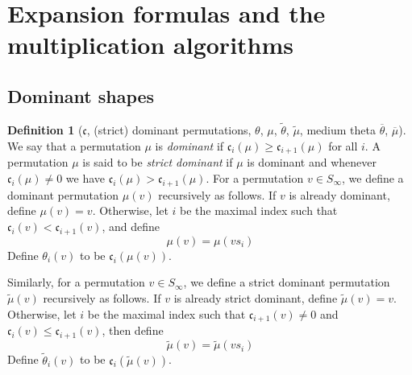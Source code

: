 \documentclass{amsart}
\theoremstyle{definition}
\newtheorem{definition}[lemma]{Definition}
\theoremstyle{remark}
\numberwithin{equation}{section}
\newcommand{\code}{\mathfrak{c}}
\begin{document}
\newcommand{\lom}{\widetilde{\lambda}}
\newcommand{\mom}{\widetilde{\mu}}
\newcommand{\thop}{\widetilde{\theta}}
\newcommand{\medperm}{\overline{\mu}}
\newcommand{\medtheta}{\overline{\theta}}
\newcommand{\Tom}[1]{\xRightarrow{#1}}
\newcommand{\dom}{\mu}

\section{Expansion formulas and the multiplication algorithms} \label{section:algorithms}

\subsection{Dominant shapes}

\begin{definition}[$\code$, (strict) dominant permutations, $\theta$, $\dom$, $\thop$, $\mom$, medium theta $\medtheta$, $\medperm$] \label{def:codetheta}
We say that a permutation $\mu$ is \emph{dominant} if $\code_i(\mu)\geq \code_{i+1}(\mu)$ for all $i$. A permutation $\mu$ is said to be \emph{strict dominant} if $\mu$ is dominant and whenever $\code_i(\mu)\neq 0$ we have $\code_i(\mu)>\code_{i+1}(\mu)$. For a permutation $v\in S_\infty$, we define a dominant permutation $\dom(v)$ recursively as follows. If $v$ is already dominant, define $\mu(v)=v$. Otherwise, let $i$ be the maximal index such that $\code_i(v)<\code_{i+1}(v)$, and define
$$\dom(v)=\dom(vs_i)$$
Define $\theta_i(v)$ to be $\code_i(\dom(v))$.

Similarly, for a permutation $v\in S_\infty$, we define a strict dominant permutation $\mom(v)$ recursively as follows. If $v$ is already strict dominant, define $\mom(v)=v$. Otherwise, let $i$ be the maximal index such that $\code_{i+1}(v)\neq 0$ and $\code_i(v)\leq \code_{i+1}(v)$, then define
$$\mom(v)=\mom(vs_i)$$
Define $\thop_i(v)$ to be $\code_i(\mom(v))$.


\end{definition}
\end{document}

